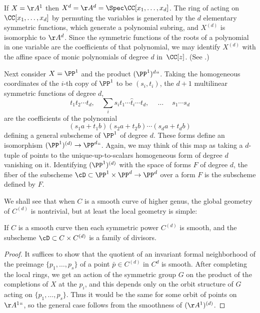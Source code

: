 If $X=\AA^{1}$ then $X^{d} = \AA^{d} = \Spec \CC[x_{1}, \dots,
x_{d}]$. The ring of 
%
acting on
$\CC[x_{1}, \dots, x_{d}]$ by permuting the variables is generated by the $d$ 
%
elementary symmetric functions, which generate a polynomial subring, and $X^{(d)}$ is isomorphic to $\AA^{d}$. Since the symmetric functions of the roots of a polynomial in one variable are the coefficients of
that polynomial, we may identify $X^{(d)}$ with the affine space of
monic polynomials of degree $d$ in~$\CC[z]$.
(See \cite[Exercises 1.6, 13.2, 13.3, 13.4]{Eisenbud1995}.)

Next consider $X = \PP^1$ and the product $(\PP^1)^d` `$. Taking the homogeneous coordinates of the
$i$-th copy of $\PP^1$ to be $(s_i,t_i)$, the $d+1$ multilinear symmetric functions of degree $d$,
$$
t_1t_2\cdots t_d,\quad \sum_i s_it_1\cdots\hat t_i\cdots t_d,\ \quad \dots \quad\ s_1\cdots s_d
$$
are the coefficients of the polynomial
$$
(s_1a + t_1b)(s_2a + t_2b)\cdots(s_da + t_db)
$$
defining a general 
subscheme
of $\PP^1$ of degree $d$. These forms  define
an isomorphism $(\PP^1)^{(d)} \to \PP^d` `$. 
Again, we may think of this map as taking a $d$-tuple of points to the unique-up-to-scalars
homogeneous form of degree $d$ vanishing on it.
Identifying $(\PP^1)^{(d)}$ with the space of forms
$F$ of degree $d$, the fiber of the subscheme $\cD\subset \PP^1 \times \PP^d \to \PP^d$
over a form $F$ is the subscheme defined by $F$.

We shall see that when $C$ is a smooth curve of higher genus, the global geometry of $C^{(d)}$ is nontrivial, but at least the local geometry is simple:

\begin{proposition}
If $C$ is a smooth curve then each symmetric power $C^{(d)}$ is smooth, and the subscheme
$\cD \subset C\times C^{(d)}$ is a family of divisors.
\unif
\end{proposition}

\begin{proof}
It suffices to
 show that the quotient of an invariant 
formal neighborhood
of the preimage $\{p_1,\dots, p_s\}$ of a point
 $\bar p\in C^{(d)}$ in $C^d$  is smooth. After completing the local rings, we get an action of the symmetric group
 $G$ on the product of the completions of $X$ at the $p_i$, and this depends only on the orbit
 structure of $G$ acting on $\{p_1,\dots, p_s\}$. Thus it would be the same for some orbit of
 points on $\AA^1` `$, so the general case follows from the smoothness of $(\AA^{1})^{(d)}$.
\unif
 \end{proof}

